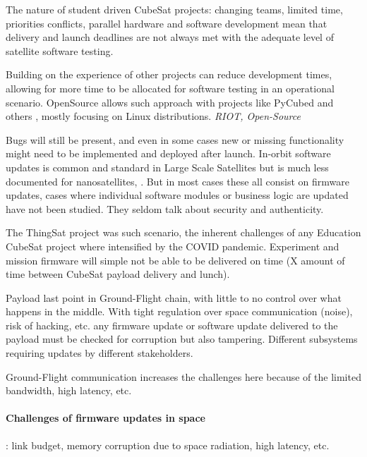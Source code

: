 The nature of student driven CubeSat projects: changing teams, limited time,
priorities conflicts, parallel hardware and software development mean that delivery
and launch deadlines are not always met with the adequate level of satellite software
testing.

Building on the experience of other projects can reduce development times, allowing
for more time to be allocated for software testing in an operational scenario. OpenSource
allows such approach with projects like PyCubed\cite{Holliday2019PyCubed} and others
\cite{shalashov2021OpenSourceCubeSatReview}, mostly focusing on Linux distributions.
\textit{RIOT, Open-Source}

Bugs will still be present, and even in some cases new or missing functionality
might need to be implemented and deployed after launch. In-orbit software updates
is common and standard in Large Scale Satellites but is much less documented
for nanosatellites,\cite{sunter2016updatesnano} \cite{maison2021otaeducubesat}.
But in most cases these all consist on firmware updates, cases where individual
software modules or business logic are updated have not been studied. They seldom
talk about security and authenticity.

The ThingSat project was such scenario, the inherent challenges of any Education
CubeSat project where intensified by the COVID pandemic. Experiment and mission
firmware will simple not be able to be delivered on time (X amount of time between
CubeSat payload delivery and lunch).

Payload last point in Ground-Flight chain, with little to no control over what
happens in the middle. With tight regulation over space communication (noise),
risk of hacking, etc. any firmware update or software update delivered to the
payload must be checked for corruption but also tampering. Different subsystems
requiring updates by different stakeholders.

Ground-Flight communication increases the challenges here because of the limited
bandwidth, high latency, etc.
\paragraph*{Challenges of firmware updates in space}: link budget, memory corruption
due to space radiation, high latency, etc.

\fi
